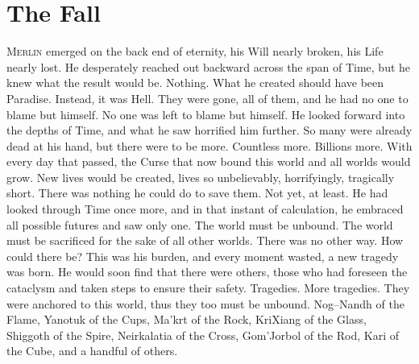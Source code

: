\chapter{The Fall}


\lettrine{M}{erlin} emerged on the back end of eternity, his Will nearly broken, his Life nearly lost. He desperately reached out backward across the span of Time, but he knew what the result would be. Nothing. What he created should have been Paradise. Instead, it was Hell. They were gone, all of them, and he had no one to blame but himself. No one was left to blame but himself.
\SmallVSpace
He looked forward into the depths of Time, and what he saw horrified him further. So many were already dead at his hand, but there were to be more. Countless more. Billions more. With every day that passed, the Curse that now bound this world and all worlds would grow. New lives would be created, lives so unbelievably, horrifyingly, tragically short. There was nothing he could do to save them.
\SmallVSpace
Not yet, at least.
\SmallVSpace
He had looked through Time once more, and in that instant of calculation, he embraced all possible futures and saw only one. The world must be unbound. The world must be sacrificed for the sake of all other worlds. There was no other way. How could there be? This was his burden, and every moment wasted, a new tragedy was born.
\SomeVSpace
He would soon find that there were others, those who had foreseen the cataclysm and taken steps to ensure their safety. Tragedies. More tragedies. They were anchored to this world, thus they too must be unbound. Nog\mbox{--}Nandh of the Flame, Yanotuk of the Cups, Ma’krt of the Rock, KriXiang of the Glass, Shiggoth of the Spire, Neirkalatia of the Cross, Gom’Jorbol of the Rod, Kari of the Cube, and a handful of others.

